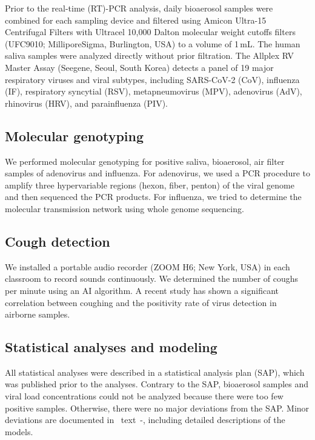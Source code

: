 \documentclass[fleqn,11pt]{wlscirep}
\begin{document}
\noindent Prior to the real-time (RT)-PCR analysis, daily bioaerosol samples were combined for each sampling device and filtered using Amicon Ultra-15 Centrifugal Filters with Ultracel 10,000 Dalton molecular weight cutoffs filters (UFC9010; MilliporeSigma, Burlington, USA) to a volume of 1\,mL. The human saliva samples were analyzed directly without prior filtration. The Allplex RV Master Assay (Seegene, Seoul, South Korea) detects a panel of 19 major respiratory viruses and viral subtypes, including SARS-CoV-2 (CoV), influenza (IF), respiratory syncytial (RSV), metapneumovirus (MPV), adenovirus (AdV), rhinovirus (HRV), and parainfluenza (PIV). 

\subsection*{Molecular genotyping}

We performed molecular genotyping for positive saliva, bioaerosol, air filter samples of adenovirus and influenza. For adenovirus, we used a PCR procedure to amplify three hypervariable regions (hexon, fiber, penton) of the viral genome and then sequenced the PCR products\cite{Akello2021SciRep}. For influenza, we tried to determine the molecular transmission network using whole genome sequencing\cite{Kelly2022FrontiersImmuno}.

\subsection*{Cough detection}

We installed a portable audio recorder (ZOOM H6; New York, USA) in each classroom to record sounds continuously. We determined the number of coughs per minute using an AI algorithm\cite{Bertschinger2023IEEE}. A recent study has shown a significant correlation between coughing and the positivity rate of virus detection in airborne samples\cite{Hanna2023PONE}.

\subsection*{Statistical analyses and modeling}

All statistical analyses were described in a statistical analysis plan (SAP)\cite{Banholzer2023SAP}, which was published prior to the analyses. Contrary to the SAP, bioaerosol samples and viral load concentrations could not be analyzed because there were too few positive samples. Otherwise, there were no major deviations from the SAP. Minor deviations are documented in \supp~text~-, including detailed descriptions of the models. \medskip
\end{document}
